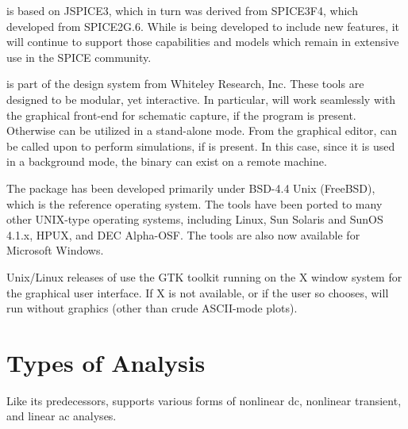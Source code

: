 {\WRspice} is based on JSPICE3, which in turn was derived from
SPICE3F4, which developed from SPICE2G.6.  While {\WRspice} is being
developed to include new features, it will continue to support those
capabilities and models which remain in extensive use in the SPICE
community.

{\WRspice} is part of the {\XicTools} design system from Whiteley
Research, Inc.  These tools are designed to be modular, yet
interactive.  In particular, {\WRspice} will work seamlessly with the
{\Xic} graphical front-end for schematic capture, if the {\Xic}
program is present.  Otherwise {\WRspice} can be utilized in a
stand-alone mode.  From the {\Xic} graphical editor, {\WRspice} can be
called upon to perform simulations, if {\WRspice} is present.  In this
case, since it is used in a background mode, the {\WRspice} binary can
exist on a remote machine.

The {\XicTools} package has been developed primarily under BSD-4.4 Unix
(FreeBSD), which is the reference operating system.  The tools
have been ported to many other UNIX-type operating systems, including
Linux, Sun Solaris and SunOS 4.1.x, HPUX, and DEC Alpha-OSF.  The tools
are also now available for Microsoft Windows.

Unix/Linux releases of {\WRspice} use the GTK toolkit running on the
X window system for the graphical user interface.  If X is not
available, or if the user so chooses, {\WRspice} will run without
graphics (other than crude ASCII-mode plots).


\section{Types of Analysis}


Like its predecessors, {\WRspice} supports various forms of nonlinear
dc, nonlinear transient, and linear ac analyses.

